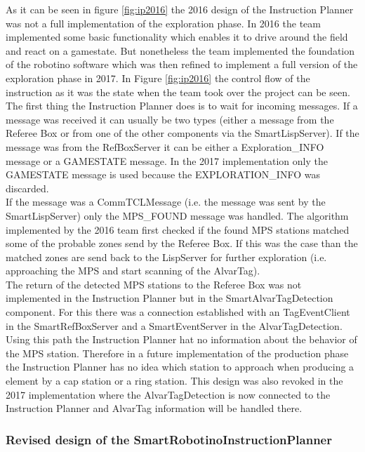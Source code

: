 As it can be seen in figure \ref{fig:ip2016} the 2016 design of the Instruction Planner was not a full implementation of the exploration phase. In 2016 the team implemented some basic functionality which enables it to drive around the field and react on a gamestate. But nonetheless the team implemented the foundation of the robotino software which was then refined to implement a full version of the exploration phase in 2017. In Figure \ref{fig:ip2016} the control flow of the instruction as it was the state when the team took over the project can be seen. The first thing the Instruction Planner does is to wait for incoming messages. If a message was received it can usually be two types (either a message from the Referee Box or from one of the other components via the SmartLispServer). If the message was from the RefBoxServer it can be either a Exploration\_INFO message or a GAMESTATE message. In the 2017 implementation only the GAMESTATE message is used because the EXPLORATION\_INFO was discarded. \\

If the message was a CommTCLMessage (i.e. the message was sent by the SmartLispServer) only the MPS\_FOUND message was handled. The algorithm implemented by the 2016 team first checked if the found MPS stations matched some of the probable zones send by the Referee Box. If this was the case than the matched zones are send back to the LispServer for further exploration (i.e. approaching the MPS and start scanning of the AlvarTag). \\

The return of the detected MPS stations to the Referee Box was not implemented in the Instruction Planner but in the SmartAlvarTagDetection component. For this there was a connection established with an TagEventClient in the SmartRefBoxServer and a SmartEventServer in the AlvarTagDetection. Using this path the Instruction Planner hat no information about the behavior of the MPS station. Therefore in a future implementation of the production phase the Instruction Planner has no idea which station to approach when producing a element by a cap station or a ring station. This design was also revoked in the 2017 implementation where the AlvarTagDetection is now connected to the Instruction Planner and AlvarTag information will be handled there. 
  
 

\subsubsection{Revised design of the SmartRobotinoInstructionPlanner}
\label{sec:new_design}

